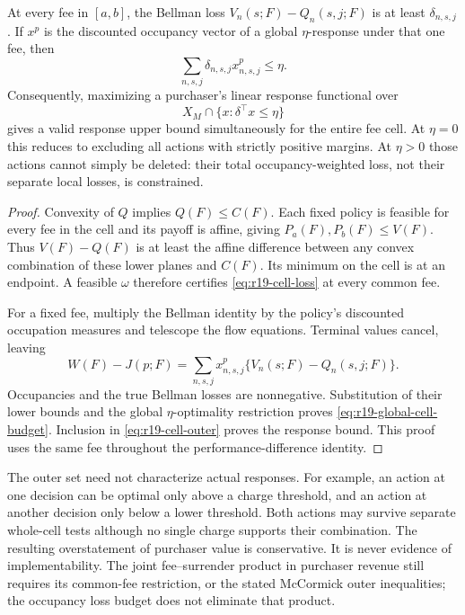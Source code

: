 \begin{theorem}
\label{thm:r19-cell}
At every fee in $[a,b]$, the Bellman loss $V_n(s;F)-Q_n(s,j;F)$ is at least $\delta_{n,s,j}$. If $x^p$ is the discounted occupancy vector of a global $\eta$-response under that one fee, then
\begin{equation}
 \sum_{n,s,j}\delta_{n,s,j}x^p_{n,s,j}\leq\eta.
 \label{eq:r19-global-cell-budget}
\end{equation}
Consequently, maximizing a purchaser's linear response functional over
\begin{equation}
 X_M\cap\{x:\delta^\top x\leq\eta\}
 \label{eq:r19-cell-outer}
\end{equation}
gives a valid response upper bound simultaneously for the entire fee cell. At $\eta=0$ this reduces to excluding all actions with strictly positive margins. At $\eta>0$ those actions cannot simply be deleted: their total occupancy-weighted loss, not their separate local losses, is constrained.
\end{theorem}
\begin{proof}
Convexity of $Q$ implies $Q(F)\leq C(F)$. Each fixed policy is feasible for every fee in the cell and its payoff is affine, giving $P_a(F),P_b(F)\leq V(F)$. Thus $V(F)-Q(F)$ is at least the affine difference between any convex combination of these lower planes and $C(F)$. Its minimum on the cell is at an endpoint. A feasible $\omega$ therefore certifies \eqref{eq:r19-cell-loss} at every common fee.

For a fixed fee, multiply the Bellman identity by the policy's discounted occupation measures and telescope the flow equations. Terminal values cancel, leaving
\[
 W(F)-J(p;F)=\sum_{n,s,j}x^p_{n,s,j}\{V_n(s;F)-Q_n(s,j;F)\}.
\]
Occupancies and the true Bellman losses are nonnegative. Substitution of their lower bounds and the global $\eta$-optimality restriction proves \eqref{eq:r19-global-cell-budget}. Inclusion in \eqref{eq:r19-cell-outer} proves the response bound. This proof uses the same fee throughout the performance-difference identity.
\end{proof}

The outer set need not characterize actual responses. For example, an action at one decision can be optimal only above a charge threshold, and an action at another decision only below a lower threshold. Both actions may survive separate whole-cell tests although no single charge supports their combination. The resulting overstatement of purchaser value is conservative. It is never evidence of implementability. The joint fee--surrender product in purchaser revenue still requires its common-fee restriction, or the stated McCormick outer inequalities; the occupancy loss budget does not eliminate that product.

